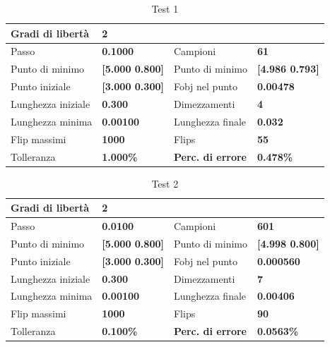 \documentclass[a4paper, 11pt]{article}
\begin{document}
\begin{table}[h]
    \caption{Test 1}
    \begin{center}
    \begin{tabular}{|l|l|l|l|} 
    \hline 
Gradi di libertà & \textbf{2} &  &  \\ \hline 
Passo & \textbf{0.1000} & Campioni & \textbf{61} \\ \hline 
Punto di minimo & \textbf{{[}5.000 0.800{]}} & Punto di minimo &
\textbf{{[}4.986 0.793{]}} \\ \hline 
Punto iniziale & \textbf{{[}3.000 0.300{]}} & Fobj nel punto & \textbf{0.00478}
\\ \hline 
Lunghezza iniziale & \textbf{0.300} & Dimezzamenti & \textbf{4} \\ \hline 
Lunghezza minima & \textbf{0.00100} & Lunghezza finale & \textbf{0.032} \\
\hline
Flip massimi & \textbf{1000} & Flips & \textbf{55} \\ \hline 
Tolleranza & \textbf{1.000\%} & \textbf{Perc. di errore} & \textbf{0.478\%} \\
\hline 
    \end{tabular}
    \end{center}
    \end{table}

\begin{table}[h]
    \caption{Test 2}
    \begin{center}
    \begin{tabular}{|l|l|l|l|} 
    \hline 
Gradi di libertà & \textbf{2} &  &  \\ \hline 
Passo & \textbf{0.0100} & Campioni & \textbf{601} \\ \hline 
Punto di minimo & \textbf{{[}5.000 0.800{]}} & Punto di minimo &
\textbf{{[}4.998 0.800{]}} \\ \hline 
Punto iniziale & \textbf{{[}3.000 0.300{]}} & Fobj nel punto & \textbf{0.000560}
\\ \hline 
Lunghezza iniziale & \textbf{0.300} & Dimezzamenti & \textbf{7} \\ \hline 
Lunghezza minima & \textbf{0.00100} & Lunghezza finale & \textbf{0.00406} \\
\hline
Flip massimi & \textbf{1000} & Flips & \textbf{90} \\ \hline 
Tolleranza & \textbf{0.100\%} & \textbf{Perc. di errore} & \textbf{0.0563\%} \\
\hline 
    \end{tabular} 
    \end{center}
    \end{table}
\end{document}
